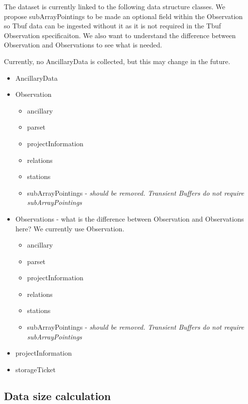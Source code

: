 \documentclass[a4paper,10pt,bibtotoc]{scrartcl}
\begin{document}

The dataset is currently linked to the following data structure classes. We propose subArrayPointings to be made an optional field within the Observation so Tbuf data can be ingested without it as it is not required in the Tbuf Observation specificaiton. We also want to understand the difference between Observation and Observations to see what is needed.

Currently, no AncillaryData is collected, but this may change in the future.

\begin{itemize}
    \item AncillaryData
    \item Observation
    \begin{itemize}
        \item ancillary
        \item parset
        \item projectInformation
        \item relations
        \item stations
        \item subArrayPointings - \textit{should be removed. Transient Buffers do not require subArrayPointings}
    \end{itemize}
    \item Observations - what is the difference between Observation and Observations here? We currently use Observation.
    \begin{itemize}
        \item ancillary
        \item parset
        \item projectInformation 
        \item relations
        \item stations
        \item subArrayPointings - \textit{should be removed. Transient Buffers do not require subArrayPointings}
    \end{itemize}
    \item projectInformation
    \item storageTicket
\end{itemize}






\subsection{Data size calculation}
\end{document}
